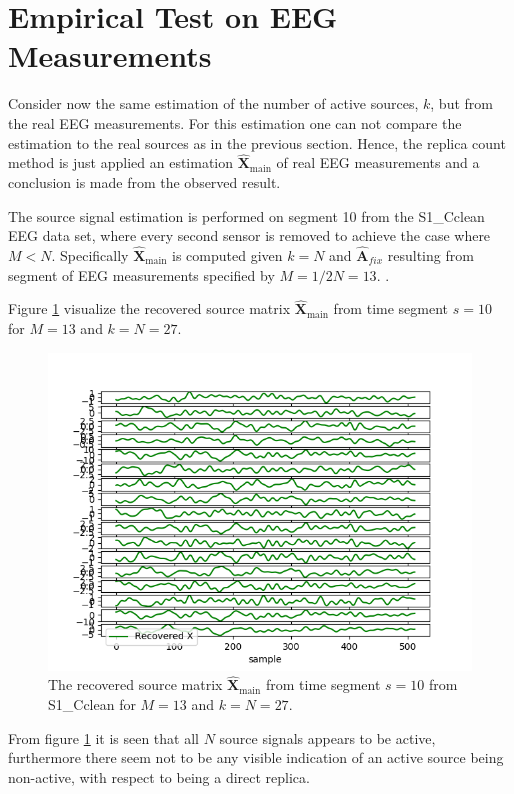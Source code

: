 \section{Empirical Test on EEG Measurements}
Consider now the same estimation of the number of active sources, $k$, but from the real EEG measurements. 
For this estimation one can not compare the estimation to the real sources as in the previous section.
Hence, the replica count method is just applied an estimation $\hat{\mathbf{X}}_{\text{main}}$ of real EEG measurements and a conclusion is made from the observed result.

The source signal estimation is performed on segment 10 from the S1\_Cclean EEG data set, where every second sensor is removed to achieve the case where $M<N$. 
Specifically $\hat{\mathbf{X}}_{\text{main}}$ is computed given $k=N$ and $\hat{\textbf{A}}_{fix}$ resulting from segment of EEG measurements specified by $M = 1/2N = 13$. 
. 

Figure \ref{fig:eeg_k} visualize the recovered source matrix $\hat{\mathbf{X}}_{\text{main}}$ from time segment $s = 10$ for $M = 13$ and $k = N = 27$.
\begin{figure}[H]
    \centering
	\includegraphics[scale=0.5]{figures/ch_estimate/eeg_k_timeseg_10.png}
	\caption{The recovered source matrix $\hat{\mathbf{X}}_{\text{main}}$ from time segment $s = 10$ from S1\_Cclean for $M = 13$ and $k = N = 27$.}
	\label{fig:eeg_k}
\end{figure}
\noindent
From figure \ref{fig:eeg_k} it is seen that all $N$ source signals appears to be active, furthermore there seem not to be any visible indication of an active source being non-active, with respect to being a direct replica. 

